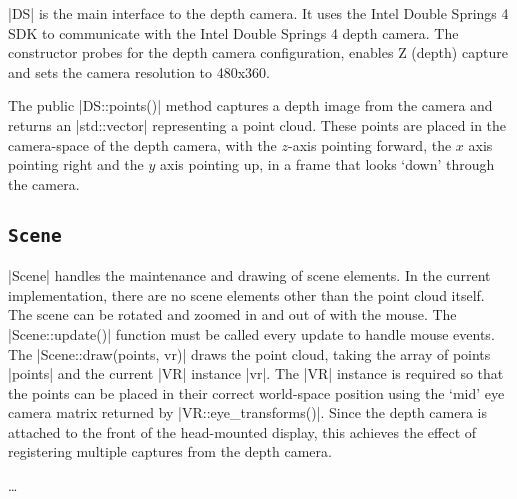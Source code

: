 \documentclass[pageno]{jpaper}
\begin{document}
|DS| is the main interface to the depth camera. It uses the Intel Double Springs
4 SDK to communicate with the Intel Double Springs 4 depth camera. The
constructor probes for the depth camera configuration, enables Z (depth) capture
and sets the camera resolution to 480x360.

The public |DS::points()| method captures a depth image from the camera and
returns an |std::vector| representing a point cloud. These points are placed in
the camera-space of the depth camera, with the $z$-axis pointing forward, the
$x$ axis pointing right and the $y$ axis pointing up, in a frame that looks
`down' through the camera.

\subsection{\lstinline|Scene|}

|Scene| handles the maintenance and drawing of scene elements. In the current
implementation, there are no scene elements other than the point cloud
itself. The scene can be rotated and zoomed in and out of with the mouse. The
|Scene::update()| function must be called every update to handle mouse
events. The |Scene::draw(points, vr)| draws the point cloud, taking the array of
points |points| and the current |VR| instance |vr|. The |VR| instance is
required so that the points can be placed in their correct world-space position
using the `mid' eye camera matrix returned by |VR::eye_transforms()|. Since the
depth camera is attached to the front of the head-mounted display, this achieves
the effect of registering multiple captures from the depth camera.

\ldots



\end{document}
